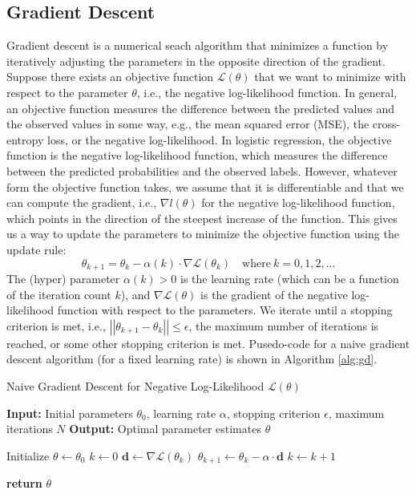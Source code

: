 \documentclass{article}[11pt]
\newcommand{\norm}[1]{\left|\left|#1\right|\right|}
\begin{document}
\subsection{Gradient Descent}
Gradient descent is a numerical seach algorithm that minimizes a function by iteratively adjusting the parameters in the opposite direction of the gradient.
Suppose there exists an objective function $\mathcal{L}(\theta)$ that we want to minimize with respect to the parameter $\theta$, i.e., the negative log-likelihood function.
In general, an objective function measures the difference between the predicted values and the observed values in some way, e.g., the mean squared error (MSE), the cross-entropy loss, or the negative log-likelihood.
In logistic regression, the objective function is the negative log-likelihood function, which measures the difference between the predicted probabilities and the observed labels. However, whatever form the objective function takes, we assume that it is differentiable and that we can compute the gradient, i.e., $\nabla{l}(\theta)$ for the negative log-likelihood function, 
which points in the direction of the steepest increase of the function. This gives us a way to update the parameters to minimize the objective function using the update rule:
\begin{equation*}
\theta_{k+1} = \theta_{k} - \alpha(k)\cdot\nabla\mathcal{L}(\theta_{k})\quad\text{where}{~k = 0,1,2,\dots}
\end{equation*}
The (hyper) parameter $\alpha(k)>0$ is the learning rate (which can be a function of the iteration count $k$), and $\nabla\mathcal{L}(\theta)$ is the gradient of the negative log-likelihood function with respect to the parameters.  
We iterate until a stopping criterion is met, i.e., $\norm{\theta_{k+1} - \theta_{k}}\leq\epsilon$, the maximum number of iterations is reached, or some other stopping criterion is met.
Pusedo-code for a naive gradient descent algorithm (for a fixed learning rate) is shown in Algorithm \ref{alg:gd}.
\begin{algorithm}[H]
\caption{Naive Gradient Descent for Negative Log-Likelihood $\mathcal{L}(\theta)$}\label{alg:gd}
\begin{algorithmic}[1]
\State \textbf{Input:} Initial parameters $\theta_0$, learning rate $\alpha$, stopping criterion $\epsilon$, maximum iterations $N$
\State \textbf{Output:} Optimal parameter estimates $\theta$

\State Initialize $\theta \gets \theta_0$
\State $k \gets 0$
    \State $\mathbf{d} \gets \nabla \mathcal{L}(\theta_{k})$
    \State $\theta_{k+1} \gets \theta_{k} - \alpha \cdot \mathbf{d}$
    \State $k \gets k + 1$
\EndWhile

\State \textbf{return} $\theta$
\end{algorithmic}
\end{algorithm}
\end{document}

